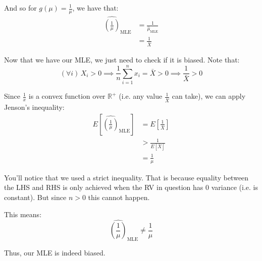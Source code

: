 \documentclass{article}
\begin{document}
And so for $g(\mu)=\frac{1}{\mu}$, we have that:
\begin{align*}
    \widehat{\left(\frac{1}{\mu}\right)}_{\text{MLE}}&=\frac{1}{{\hat{\mu}}_{\text{MLE}}}\tag{invariance of MLEs}\\
    &=\frac{1}{\bar X}\tag{MLE of $\mu$}
\end{align*}
\newpage

Now that we have our MLE, we just need to check if it is biased. Note that:
$$(\forall i)\,X_i>0\implies\frac{1}{n}\sum_{i=1}^nx_i=\bar X>0\implies\frac{1}{\bar X}>0$$

Since $\frac{1}{x}$ is a convex function over $\mathbb R^+$ (i.e. any value $\frac{1}{\bar X}$ can take), we can apply Jenson's inequality:
\begin{align*}
    E\left[\widehat{\left(\frac{1}{\mu}\right)}_{\text{MLE}}\right]&=E\left[\frac{1}{\bar X}\right]\\
    &>\frac{1}{E[\bar X]}\tag{Jenson's inequality}\\
    &=\frac{1}{\mu}\tag{mean of sample mean}
\end{align*}

You'll notice that we used a strict inequality. That is because equality between the LHS and RHS is only achieved when the RV in question has 0 variance (i.e. is constant). But since $n>0$ this cannot happen.

This means:
$$\widehat{\left(\frac{1}{\mu}\right)}_{\text{MLE}}\not=\frac{1}{\mu}$$

Thus, our MLE is indeed biased.
\end{document}
